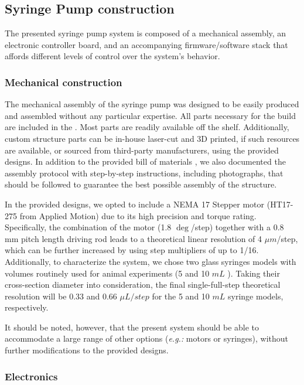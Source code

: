 \subsection*{Syringe Pump construction}
The presented syringe pump system is composed of a mechanical assembly, an electronic controller board, and an accompanying firmware/software stack that affords different levels of control over the system's behavior.

\subsubsection*{Mechanical construction}
The mechanical assembly of the syringe pump was designed to be easily produced and assembled without any particular expertise. All parts necessary for the build are included in the . Most parts are readily available off the shelf. Additionally, custom structure parts can be in-house laser-cut and 3D printed, if such resources are available, or sourced from third-party manufacturers, using the provided designs. In addition to the provided bill of materials , we also documented the assembly protocol with step-by-step instructions, including photographs, that should be followed to guarantee the best possible assembly of the structure.

In the provided designs, we opted to include a NEMA 17 Stepper motor (HT17-275 from Applied Motion) due to its high precision and torque rating. Specifically, the combination of the motor (1.8 $\deg$/step) together with a 0.8 mm pitch length driving rod leads to a theoretical linear resolution of 4 $\mu m$/step, which can be further increased by using step multipliers of up to 1/16.
Additionally, to characterize the system, we chose two glass syringes models with volumes routinely used for animal experiments (5 and 10 $mL$ ). Taking their cross-section diameter into consideration, the final single-full-step theoretical resolution will be 0.33 and 0.66 $\mu L / step$ for the 5 and 10 $mL$ syringe models, respectively.

It should be noted, however, that the present system should be able to accommodate a large range of other options (\textit{e.g.:} motors or syringes), without further modifications to the provided designs.

\subsubsection*{Electronics}

